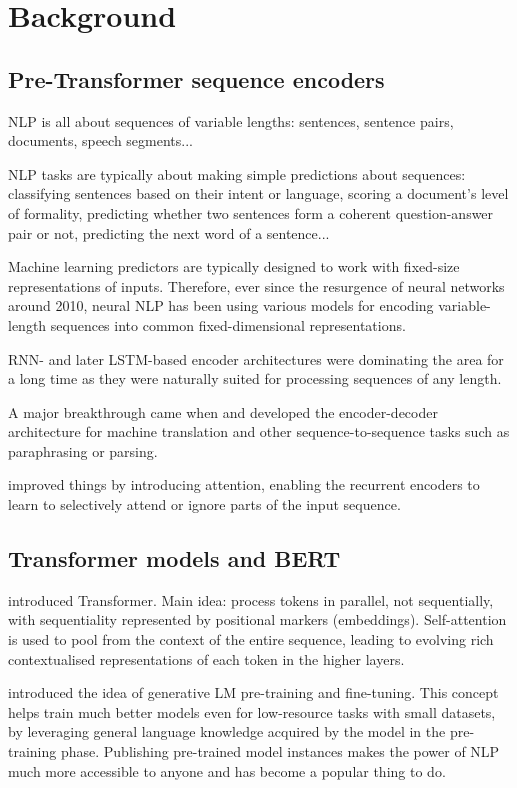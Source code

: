 \documentclass[bsc,frontabs,twoside,singlespacing,parskip,deptreport]{infthesis}
\begin{document}
\chapter{Background}{
  \section{Pre-Transformer sequence encoders}{
    NLP is all about sequences of variable lengths: sentences, sentence pairs, documents, speech segments...

    NLP tasks are typically about making simple predictions about sequences: classifying sentences based on their intent or language, scoring a document's level of formality, predicting whether two sentences form a coherent question-answer pair or not, predicting the next word of a sentence...

    Machine learning predictors are typically designed to work with fixed-size representations of inputs. Therefore, ever since the resurgence of neural networks around 2010, neural NLP has been using various models for encoding variable-length sequences into common fixed-dimensional representations.

    RNN- and later LSTM-based encoder architectures were dominating the area for a long time as they were naturally suited for processing sequences of any length.

    A major breakthrough came when \citet{Kalchbrenner_2013} and \citet{Sutskever_2014} developed the encoder-decoder architecture for machine translation and other sequence-to-sequence tasks such as paraphrasing or parsing.

    \citet{Bahdanau_2014} improved things by introducing attention, enabling the recurrent encoders to learn to selectively attend or ignore parts of the input sequence.
  }

  \section{Transformer models and BERT}{
    \citet{Vaswani_2017} introduced Transformer. Main idea: process tokens in parallel, not sequentially, with sequentiality represented by positional markers (embeddings). Self-attention is used to pool from the context of the entire sequence, leading to evolving rich contextualised representations of each token in the higher layers.
    
    \citet{Radford_2018} introduced the idea of generative LM pre-training and fine-tuning. This concept helps train much better models even for low-resource tasks with small datasets, by leveraging general language knowledge acquired by the model in the pre-training phase. Publishing pre-trained model instances makes the power of NLP much more accessible to anyone and has become a popular thing to do.
    
}}
\end{document}
